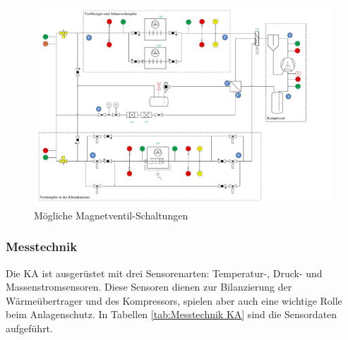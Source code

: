 \begin{figure}[htb]
\centering		
\hspace{2cm}\includegraphics[page={3},width=1.15\textwidth]{Pictures/Schaltschema.pdf}
\caption{Mögliche Magnetventil-Schaltungen}
\label{fig:Magnetventil}
\end{figure}

\subsubsection*{Messtechnik}
\label{subsubsec:Messtechnik}

Die KA ist ausgerüstet mit drei Sensorenarten: Temperatur-, Druck- und Massenstromsensoren. Diese Sensoren dienen zur Bilanzierung der Wärmeübertrager und des Kompressors, spielen aber auch eine wichtige Rolle beim Anlagenschutz. In Tabellen \ref{tab:Messtechnik KA} sind die Sensordaten aufgeführt. 



